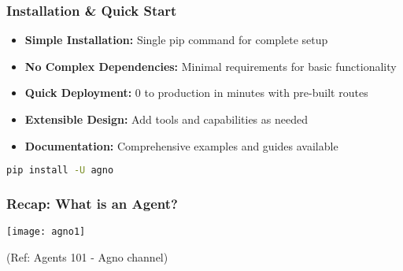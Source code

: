 \begin{frame}[fragile]\frametitle{Installation \& Quick Start}
      \begin{itemize}
	\item \textbf{Simple Installation:} Single pip command for complete setup
	\item \textbf{No Complex Dependencies:} Minimal requirements for basic functionality
	\item \textbf{Quick Deployment:} 0 to production in minutes with pre-built routes
	\item \textbf{Extensible Design:} Add tools and capabilities as needed
	\item \textbf{Documentation:} Comprehensive examples and guides available
	  \end{itemize}
      
      \begin{lstlisting}[language=bash]
pip install -U agno
      \end{lstlisting}
\end{frame}

\begin{frame}[fragile]\frametitle{Recap: What is an Agent?}

\begin{center}
\texttt{[image: agno1]}

{\tiny (Ref: Agents 101 - Agno channel)}
\end{center}	  
\end{frame}


